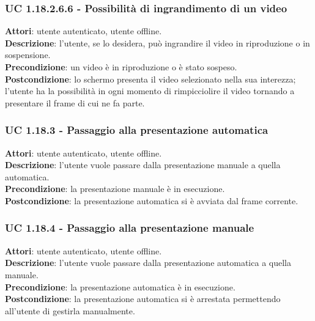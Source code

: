 	\subsubsection{UC 1.18.2.6.6 - Possibilità di ingrandimento di un video}{
		\label{uc1.18.2.6.6}
		\textbf{Attori}: utente autenticato, utente offline. \\
		\textbf{Descrizione}: l'utente, se lo desidera, può ingrandire il video in riproduzione o in sospensione. \\
		\textbf{Precondizione}: un video è in riproduzione o è stato sospeso.	\\
		\textbf{Postcondizione}: lo schermo presenta il video selezionato nella sua interezza; l'utente ha la possibilità in ogni momento di rimpicciolire il video tornando a presentare il frame di cui ne fa parte.
	}
	\subsubsection{UC 1.18.3 - Passaggio alla presentazione automatica}{
		\label{uc1.18.3}
		\textbf{Attori}: utente autenticato, utente offline. \\
		\textbf{Descrizione}: l'utente vuole passare dalla presentazione manuale a quella automatica. \\
		\textbf{Precondizione}: la presentazione manuale è in esecuzione.	\\
		\textbf{Postcondizione}: la presentazione automatica si è avviata dal frame corrente.
	}
	\subsubsection{UC 1.18.4 - Passaggio alla presentazione manuale}{
		\label{uc1.18.4}
		\textbf{Attori}: utente autenticato, utente offline. \\
		\textbf{Descrizione}: l'utente vuole passare dalla presentazione automatica a quella manuale. \\
		\textbf{Precondizione}: la presentazione automatica è in esecuzione.	\\
		\textbf{Postcondizione}: la presentazione automatica si è arrestata permettendo all'utente di gestirla manualmente.
	}